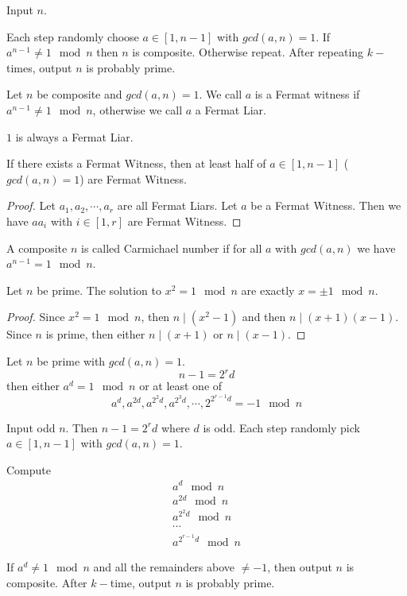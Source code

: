 
\begin{algorithm}
Input $n$. 

Each step randomly choose $a\in [1,n-1]$ with $gcd(a,n) = 1$. If $a^{n-1} \neq 1 \mod n$ then $n$ is composite. Otherwise repeat. After repeating $k-$times, output $n$ is probably prime.
\end{algorithm}

\begin{defn}
Let $n$ be composite and $gcd(a,n) = 1$. We call $a$ is a Fermat witness if $a^{n-1} \neq 1 \mod n$, otherwise we call $a$ a Fermat Liar.
\end{defn}

\begin{exmp}
$1$ is always a Fermat Liar.
\end{exmp}

\begin{prop}
If there exists a Fermat Witness, then at least half of $a\in [1,n-1]$ ($gcd(a,n) = 1$) are Fermat Witness.
\end{prop}
\begin{proof}
Let $a_1,a_2,\cdots ,a_r$ are all Fermat Liars. Let $a$ be a Fermat Witness. Then we have $aa_i$ with $i\in [1,r]$ are Fermat Witness.
\end{proof}

\begin{defn}
A composite $n$ is called Carmichael number if for all $a$ with $gcd(a,n)$ we have $a^{n-1} = 1 \mod n$.
\end{defn}

\begin{lem}
Let $n$ be prime. The solution to $x^2 = 1\mod n$ are exactly $x = \pm 1 \mod n$.
\end{lem}
\begin{proof}
Since $x^2 = 1\mod n$, then $n\mid (x^2-1)$ and then $n\mid (x+1)(x-1)$. Since $n$ is prime, then either $n\mid (x+1)$ or $n\mid (x-1)$.
\end{proof}

\begin{prop}
Let $n$ be prime with $gcd(a,n) = 1$. \[n-1 = 2^rd\] then either $a^d = 1 \mod n$ or at least one of \[a^d , a^{2d},a^{2^2d},a^{2^3d},\cdots ,2^{2^{r-1}d} = -1 \mod n\]
\end{prop}

\begin{algorithm}
Input odd $n$. Then $n-1 = 2^rd$ where $d$ is odd. Each step randomly pick $a\in [1,n-1]$ with $gcd(a,n) = 1$.

Compute \begin{gather*}
    a^d \mod n\\
    a^{2d} \mod n\\
    a^{2^2 d }\mod n\\
    \cdots \\
    a^{2^{r-1}d} \mod n
\end{gather*}

If $a^d \neq 1 \mod n$ and all the remainders above $\neq -1$, then output $n$ is composite. After $k-$time, output $n$ is probably prime.
\end{algorithm}

